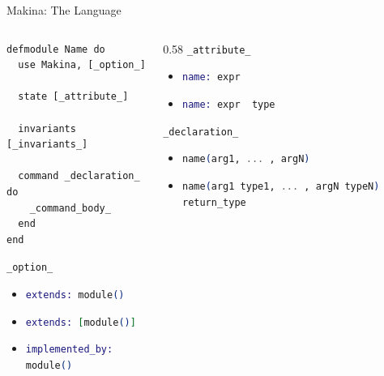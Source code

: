\documentclass[aspectratio=169, 10pt, handout]{beamer}
\begin{document}
\begin{frame}[label={sec:orgba533c1},fragile]{Makina: The Language}
 \begin{columns}
\begin{column}{0.38\columnwidth}
\lstset{language=elixir,label= ,caption= ,captionpos=b,numbers=none,style=display}
\begin{lstlisting}
defmodule Name do
  use Makina, [_option_]

  state [_attribute_]

  invariants [_invariants_]

  command _declaration_ do
    _command_body_
  end
end
\end{lstlisting}

\lstinline[language=elixir, style=display]~_option_~
\begin{itemize}
\item \lstinline[language=elixir, style=display]~extends: module()~
\item \lstinline[language=elixir, style=display]~extends: [module()]~
\item \lstinline[language=elixir, style=display]~implemented_by: module()~
\end{itemize}
\end{column}

\begin{column}{0.58\columnwidth}
\lstinline[language=elixir, style=display]~_attribute_~
\begin{itemize}
\item \lstinline[language=elixir, style=display]~name: expr~
\item \lstinline[language=elixir, style=display]~name: expr  type~
\end{itemize}

\vspace{10pt}
\lstinline[language=elixir, style=display]~_declaration_~
\begin{itemize}
\item \lstinline[language=elixir, style=display]~name(arg1, ... , argN)~
\item \lstinline[language=elixir, style=display]~name(arg1 type1, ... , argN typeN) return_type~
\end{itemize}


\end{column}
\end{columns}
\end{frame}
\end{document}

